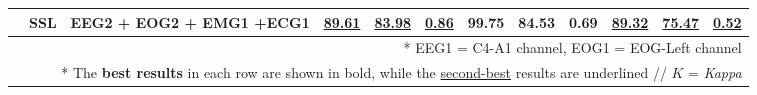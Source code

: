\begin{table*}[!htbp]
{{\begin{tabular}{c|c|c|ccc|ccc|ccc}
                                                                               & SSL                                    & EEG2 + EOG2 + EMG1 +ECG1                   & \uline{89.61}  & \uline{83.98}  & \uline{0.86}                                            & \textbf{99.75} & \textbf{84.53} & \textbf{0.69}                               & \uline{89.32}  & \uline{75.47}  & \uline{0.52}                                   \\
\hline
\multicolumn{12}{r}{* EEG1 = C4-A1 channel, EOG1 = EOG-Left channel} \\
\multicolumn{12}{r}{* The \textbf{best results} in each row are shown in bold, while the \uline{second-best} results are underlined // $K$ = \textit{Kappa}} \\
\end{tabular}}
}
\vspace{-2mm}
\end{table*}